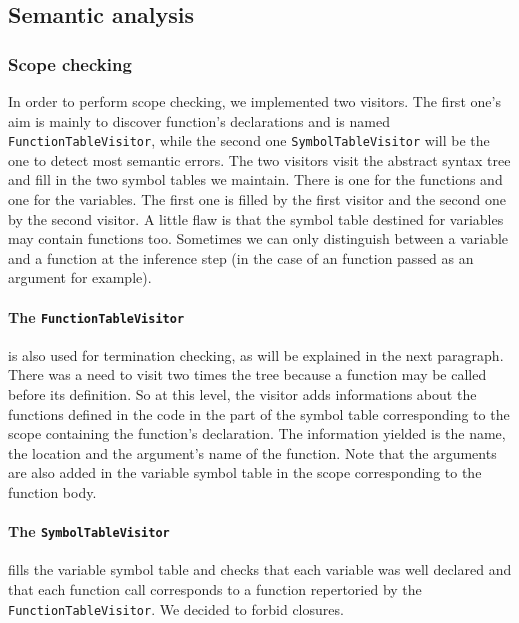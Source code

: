 \documentclass[a4paper,11pt]{article}
\begin{document}
\subsection{Semantic analysis}
\subsubsection{Scope checking}
In order to perform scope checking, we implemented two visitors. The first one's aim is mainly to discover function's declarations and is named \texttt{FunctionTableVisitor}, while the second one \texttt{SymbolTableVisitor} will be the one to detect most semantic errors. The two visitors visit the abstract syntax tree and fill in the two symbol tables we maintain. There is one for the functions and one for the variables. The first one is filled by the first visitor and the second one by the second visitor. A little flaw is that the symbol table destined for variables may contain functions too. Sometimes we can only distinguish between a variable and a function at the inference step (in the case of an function passed as an argument for example).
\paragraph{The \texttt{FunctionTableVisitor}} is also used for termination checking, as will be explained in the next paragraph. There was a need to visit two times the tree because a function may be called before its definition. So at this level, the visitor adds informations about the functions defined in the code in the part of the symbol table corresponding to the scope containing the function's declaration. The information yielded is the name, the location and the argument's name of the function. Note that the arguments are also added in the variable symbol table in the scope corresponding to the function body.

\paragraph{The \texttt{SymbolTableVisitor}} fills the variable symbol table and checks that each variable was well declared and that each function call corresponds to a function repertoried by the \texttt{FunctionTableVisitor}. We decided to forbid closures.  
\end{document}
